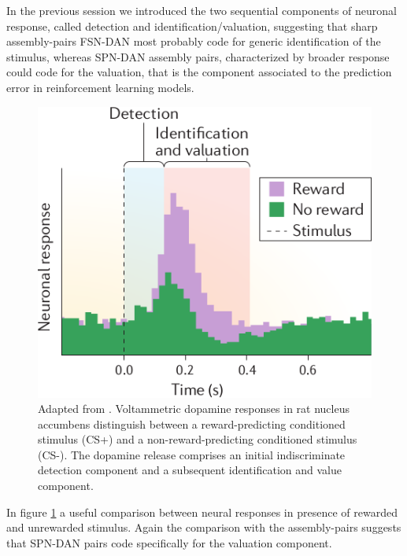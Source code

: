 In the previous session we introduced the two sequential components of neuronal response, called detection and identification/valuation, suggesting that sharp assembly-pairs FSN-DAN most probably code for generic identification of the stimulus, whereas SPN-DAN assembly pairs, characterized by broader response could code for the valuation, that is the component associated to the prediction error in reinforcement learning models.\\
\begin{figure}
    \centering
    \includegraphics[scale=0.4]{figures/Schultz2016CSMod.png}
    \caption{Adapted from \cite{Schultz2016}. Voltammetric dopamine responses in rat nucleus accumbens distinguish between a reward-predicting conditioned stimulus (CS+) and a non-reward-predicting conditioned stimulus (CS-). The dopamine release comprises an initial indiscriminate detection component and a subsequent identification and value component.}
    \label{fig:dopCS}
\end{figure}
In figure \ref{fig:dopCS} a useful comparison between neural responses in presence of rewarded and unrewarded stimulus. Again the comparison with the assembly-pairs suggests that SPN-DAN pairs code specifically for the valuation component.
